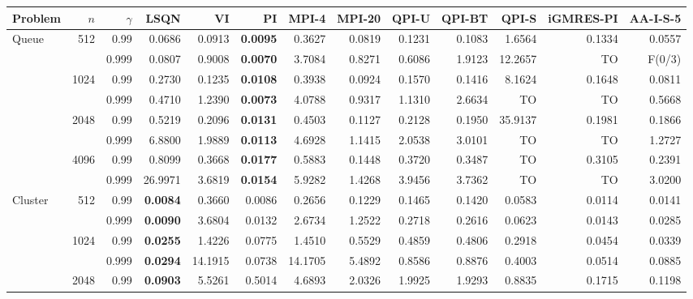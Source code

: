 \begin{landscape}
\begin{table}[p]
\centering
\begingroup
\fontsize{8}{9}\selectfont
\setlength{\tabcolsep}{3.8pt}
\renewcommand{\arraystretch}{1.08}
\begin{tabular}{@{}lrr*{10}{r}@{}}
\toprule
Problem & $n$ & $\gamma$ & \textbf{LSQN} & VI & PI & MPI-4 & MPI-20 & QPI-U & QPI-BT & QPI-S & iGMRES-PI & AA-I-S-5 \\
\midrule
Queue & 512 & 0.99 & 0.0686 & 0.0913 & \textbf{0.0095} & 0.3627 & 0.0819 & 0.1231 & 0.1083 & 1.6564 & 0.1334 & 0.0557 \\
 &  & 0.999 & 0.0807 & 0.9008 & \textbf{0.0070} & 3.7084 & 0.8271 & 0.6086 & 1.9123 & 12.2657 & TO & F(0/3) \\
 & 1024 & 0.99 & 0.2730 & 0.1235 & \textbf{0.0108} & 0.3938 & 0.0924 & 0.1570 & 0.1416 & 8.1624 & 0.1648 & 0.0811 \\
 &  & 0.999 & 0.4710 & 1.2390 & \textbf{0.0073} & 4.0788 & 0.9317 & 1.1310 & 2.6634 & TO & TO & 0.5668 \\
 & 2048 & 0.99 & 0.5219 & 0.2096 & \textbf{0.0131} & 0.4503 & 0.1127 & 0.2128 & 0.1950 & 35.9137 & 0.1981 & 0.1866 \\
 &  & 0.999 & 6.8800 & 1.9889 & \textbf{0.0113} & 4.6928 & 1.1415 & 2.0538 & 3.0101 & TO & TO & 1.2727 \\
 & 4096 & 0.99 & 0.8099 & 0.3668 & \textbf{0.0177} & 0.5883 & 0.1448 & 0.3720 & 0.3487 & TO & 0.3105 & 0.2391 \\
 &  & 0.999 & 26.9971 & 3.6819 & \textbf{0.0154} & 5.9282 & 1.4268 & 3.9456 & 3.7362 & TO & TO & 3.0200 \\
\midrule
Cluster & 512 & 0.99 & \textbf{0.0084} & 0.3660 & 0.0086 & 0.2656 & 0.1229 & 0.1465 & 0.1420 & 0.0583 & 0.0114 & 0.0141 \\
 &  & 0.999 & \textbf{0.0090} & 3.6804 & 0.0132 & 2.6734 & 1.2522 & 0.2718 & 0.2616 & 0.0623 & 0.0143 & 0.0285 \\
 & 1024 & 0.99 & \textbf{0.0255} & 1.4226 & 0.0775 & 1.4510 & 0.5529 & 0.4859 & 0.4806 & 0.2918 & 0.0454 & 0.0339 \\
 &  & 0.999 & \textbf{0.0294} & 14.1915 & 0.0738 & 14.1705 & 5.4892 & 0.8586 & 0.8876 & 0.4003 & 0.0514 & 0.0885 \\
 & 2048 & 0.99 & \textbf{0.0903} & 5.5261 & 0.5014 & 4.6893 & 2.0326 & 1.9925 & 1.9293 & 0.8835 & 0.1715 & 0.1198 \\

\end{tabular}
\end{table}
\end{landscape}
